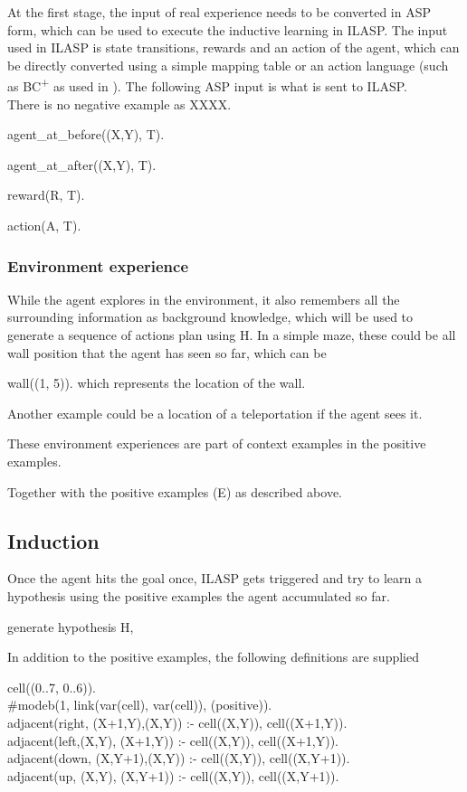 At the first stage, the input of real experience needs to be converted in ASP form, which can be used to execute the inductive learning in ILASP. The input used in ILASP is state transitions, 
rewards and an action of the agent, which can be directly converted using a simple mapping table or an action language (such as BC\textsuperscript{+} as used in \cite{Ferreira2017}). 
The following ASP input is what is sent to ILASP. \\

There is no negative example as XXXX. 

agent\_at\_before((X,Y), T).

agent\_at\_after((X,Y), T).

reward(R, T).

action(A, T).

\subsubsection{Environment experience}

While the agent explores in the environment, it also remembers all the surrounding information as background knowledge, 
which will be used to generate a sequence of actions plan using H. In a simple maze, these could be all wall position that the agent has seen so far, which can be 

wall((1, 5)). which represents the location of the wall. 

Another example could be a location of a teleportation if the agent sees it. 

These environment experiences are part of context examples in the positive examples. 

Together with the positive examples (E) as described above. 

\subsection{Induction}
\label{induction}

Once the agent hits the goal once, ILASP gets triggered and try to learn a hypothesis using the positive examples the agent accumulated so far. 

generate hypothesis H,

In addition to the positive examples, the following definitions are supplied

cell((0..7, 0..6)). \\
\#modeb(1, link(var(cell), var(cell)), (positive)). \\
adjacent(right, (X+1,Y),(X,Y))   :- cell((X,Y)), cell((X+1,Y)). \\
adjacent(left,(X,Y),  (X+1,Y)) :- cell((X,Y)), cell((X+1,Y)). \\
adjacent(down, (X,Y+1),(X,Y))   :- cell((X,Y)), cell((X,Y+1)). \\
adjacent(up,   (X,Y),  (X,Y+1)) :- cell((X,Y)), cell((X,Y+1)). \\

